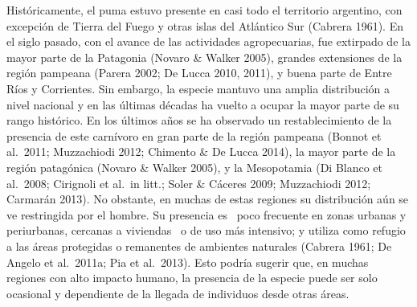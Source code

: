 \documentclass[
  x11names]{article}
\begin{document}
Históricamente, el puma estuvo presente en casi todo el territorio
argentino, con excepción de Tierra del Fuego y otras islas del Atlántico
Sur (Cabrera 1961). En el siglo pasado, con el avance de las actividades
agropecuarias, fue extirpado de la mayor parte de la Patagonia (Novaro
\& Walker 2005), grandes extensiones de la región pampeana (Parera 2002;
De Lucca 2010, 2011), y buena parte de Entre Ríos y Corrientes. Sin
embargo, la especie mantuvo una amplia distribución a nivel nacional y
en las últimas décadas ha vuelto a ocupar la mayor parte de su rango
histórico. En los últimos años se ha observado un restablecimiento de la
presencia de este carnívoro en gran parte de la región pampeana (Bonnot
et al.~2011; Muzzachiodi 2012; Chimento \& De Lucca 2014), la mayor
parte de la región patagónica (Novaro \& Walker 2005), y la Mesopotamia
(Di Blanco et al.~2008; Cirignoli et al.~in litt.; Soler \& Cáceres
2009; Muzzachiodi 2012; Carmarán 2013). No obstante, en muchas de estas
regiones su distribución aún se ve restringida por el hombre. Su
presencia es~ poco frecuente en zonas urbanas y periurbanas, cercanas a
viviendas~ o de uso más intensivo; y utiliza como refugio a las áreas
protegidas o remanentes de ambientes naturales (Cabrera 1961; De Angelo
et al.~2011a; Pia et al.~2013). Esto podría sugerir que, en muchas
regiones con alto impacto humano, la presencia de la especie puede ser
solo ocasional y dependiente de la llegada de individuos desde otras
áreas.
\end{document}
